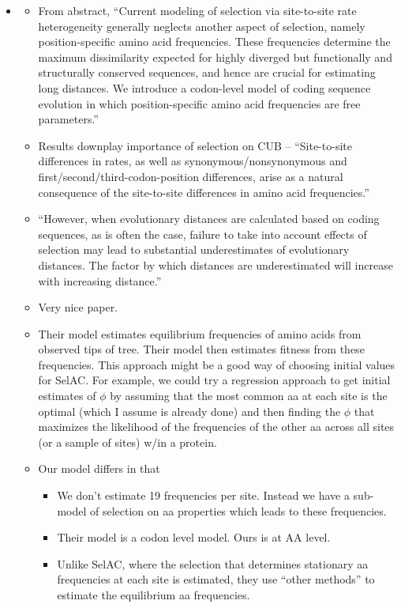 \begin{itemize}
\begin{itemize}
\item \citet{HalpernAndBruno1998}
  \begin{itemize}
  \item From abstract, ``Current modeling of selection via site-to-site rate heterogeneity generally neglects another aspect of selection, namely position-specific amino acid frequencies. These frequencies determine the maximum dissimilarity expected for highly diverged but functionally and structurally conserved sequences, and hence are crucial for estimating long distances. We introduce a codon-level model of coding sequence evolution in which position-specific amino acid frequencies are free parameters.''
  \item Results downplay importance of selection on CUB --
    ``Site-to-site differences in rates, as well as synonymous/nonsynonymous and first/second/third-codon-position differences, arise as a natural consequence of the site-to-site differences in amino acid frequencies.''
  \item ``However, when evolutionary distances are calculated based on coding sequences, as is often the case, failure to take into account effects of selection may lead to substantial underestimates of evolutionary distances. The factor by which distances are underestimated will increase with increasing distance.''
  \item Very nice paper.
  \item Their model estimates equilibrium frequencies of amino acids from observed tips of tree.
    Their model then estimates fitness from these frequencies.
    This approach might be a good way of choosing initial values for SelAC.
    For example, we could try a regression approach to get initial estimates of $\phi$ by assuming that the most common aa at each site is the optimal (which I assume is already done) and then finding the $\phi$ that maximizes the likelihood of the frequencies of the other aa across all sites (or a sample of sites) w/in a protein. 
  \item Our model differs in that
    \begin{itemize}
    \item  We don't estimate 19 frequencies per site.
    Instead we have a sub-model of selection on aa properties which leads to these frequencies.
  \item Their model is a codon level model. 
    Ours is at AA level.
  \item Unlike SelAC, where the selection that determines stationary aa frequencies at each site is estimated,  they use ``other methods'' to estimate the equilibrium aa frequencies.

\end{itemize}
\end{itemize}
\end{itemize}
\end{itemize}
